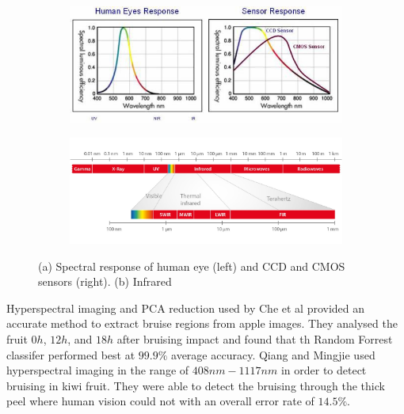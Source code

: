 \documentclass[fleqn,twoside]{article}
\begin{document}
\begin{figure}[h]
	\centering
	\begin{subfigure}{.9\textwidth}
		\centering
		\includegraphics[width=0.9\linewidth]{spectralresponse.jpg}
		\caption{}
		\label{fig:eye_sensor}
	\end{subfigure}

	\begin{subfigure}{.9\textwidth}
		\centering
		\includegraphics[width=.9\linewidth]{infra-red.jpg}
		\caption{}
		\label{fig:ifra-red}
	\end{subfigure}%
	\caption{(a) Spectral response of human eye (left) and CCD and CMOS sensors (right). (b) Infrared}
	\label{fig:spectrum}
\end{figure}%


Hyperspectral imaging and PCA reduction used by Che et al \cite{che} provided an accurate method to extract bruise regions from apple images. They analysed the fruit $0h$, $12h$, and $18h$ after bruising impact and found that th Random Forrest classifer performed best at $99.9\%$ average accuracy. Qiang and Mingjie \cite{qiang} used hyperspectral imaging  in the range of $408nm-1117nm$ in order to detect bruising in kiwi fruit. They were able to detect the bruising through the thick peel where human vision could not with an overall error rate of $14.5\%$. 
\end{document}
